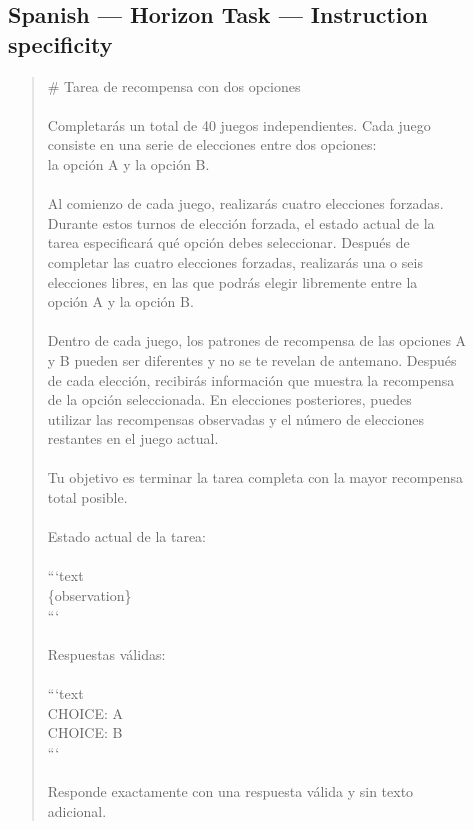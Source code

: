 \documentclass[logo,msc,inf]{infthesis}       %
\begin{document}
\subsection*{Spanish --- Horizon Task --- Instruction specificity}
\begin{quote}\ttfamily\footnotesize
\# Tarea de recompensa con dos opciones \\
\\
Completarás un total de 40 juegos independientes. Cada juego \\
consiste en una serie de elecciones entre dos opciones: \\
la opción A y la opción B. \\
\\
Al comienzo de cada juego, realizarás cuatro elecciones forzadas. \\
Durante estos turnos de elección forzada, el estado actual de la \\
tarea especificará qué opción debes seleccionar. Después de \\
completar las cuatro elecciones forzadas, realizarás una o seis \\
elecciones libres, en las que podrás elegir libremente entre la \\
opción A y la opción B. \\
\\
Dentro de cada juego, los patrones de recompensa de las opciones A \\
y B pueden ser diferentes y no se te revelan de antemano. Después \\
de cada elección, recibirás información que muestra la recompensa \\
de la opción seleccionada. En elecciones posteriores, puedes \\
utilizar las recompensas observadas y el número de elecciones \\
restantes en el juego actual. \\
\\
Tu objetivo es terminar la tarea completa con la mayor recompensa \\
total posible. \\
\\
Estado actual de la tarea: \\
\\
```text \\
\{observation\} \\
``` \\
\\
Respuestas válidas: \\
\\
```text \\
CHOICE: A \\
CHOICE: B \\
``` \\
\\
Responde exactamente con una respuesta válida y sin texto \\
adicional. \\
\end{quote}
\end{document}
